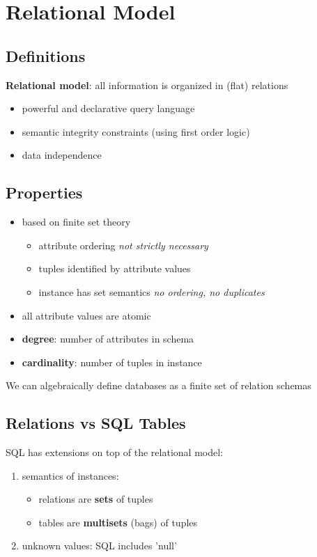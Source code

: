 \documentclass[]{article}
\theoremstyle{definition}
\begin{document}
				
	\section{Relational Model}
		\subsection{Definitions}
			\textbf{Relational model}: all information is organized in (flat) relations
			\begin{itemize}
				\item powerful and declarative query language
				\item semantic integrity constraints (using first order logic)
				\item data independence
			\end{itemize}	
		\subsection{Properties}
			\begin{itemize}
				\item based on finite set theory
					\begin{itemize}
						\item attribute ordering \textit{not strictly necessary}
						\item tuples identified by attribute values
						\item instance has set semantics \textit{no ordering, no duplicates}
					\end{itemize}
				\item all attribute values are atomic 
				\item \textbf{degree}: number of attributes in schema
				\item \textbf{cardinality}: number of tuples in instance
			\end{itemize}			 			
				
			We can algebraically define databases as a finite set of relation schemas
		\subsection{Relations vs SQL Tables}
			SQL has extensions on top of the relational model:
			\begin{enumerate}
				\item semantics of instances:
					\begin{itemize}
						\item relations are \textbf{sets} of tuples
						\item tables are \textbf{multisets} (bags) of tuples 
					\end{itemize}
				\item unknown values: SQL includes 'null'
			\end{enumerate}
\end{document}
